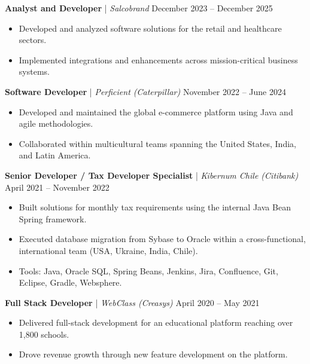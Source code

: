 \documentclass[11pt,a4paper]{article}
\begin{document}
\vspace{8pt}

\textbf{Analyst and Developer} | \textit{Salcobrand} \hfill December 2023 -- December 2025 \\
\begin{itemize}[noitemsep, topsep=0pt]
    \item Developed and analyzed software solutions for the retail and healthcare sectors.
    \item Implemented integrations and enhancements across mission-critical business systems.
\end{itemize}

\vspace{8pt}

\textbf{Software Developer} | \textit{Perficient (Caterpillar)} \hfill November 2022 -- June 2024 \\
\begin{itemize}[noitemsep, topsep=0pt]
    \item Developed and maintained the global e-commerce platform using Java and agile methodologies.
    \item Collaborated within multicultural teams spanning the United States, India, and Latin America.
\end{itemize}

\vspace{8pt}

\textbf{Senior Developer / Tax Developer Specialist} | \textit{Kibernum Chile (Citibank)} \hfill April 2021 -- November 2022 \\
\begin{itemize}[noitemsep, topsep=0pt]
    \item Built solutions for monthly tax requirements using the internal Java Bean Spring framework.
    \item Executed database migration from Sybase to Oracle within a cross-functional, international team (USA, Ukraine, India, Chile).
    \item Tools: Java, Oracle SQL, Spring Beans, Jenkins, Jira, Confluence, Git, Eclipse, Gradle, Websphere.
\end{itemize}

\vspace{8pt}

\textbf{Full Stack Developer} | \textit{WebClass (Creasys)} \hfill April 2020 -- May 2021 \\
\begin{itemize}[noitemsep, topsep=0pt]
    \item Delivered full-stack development for an educational platform reaching over 1,800 schools.
    \item Drove revenue growth through new feature development on the platform.
\end{itemize}
\end{document}
